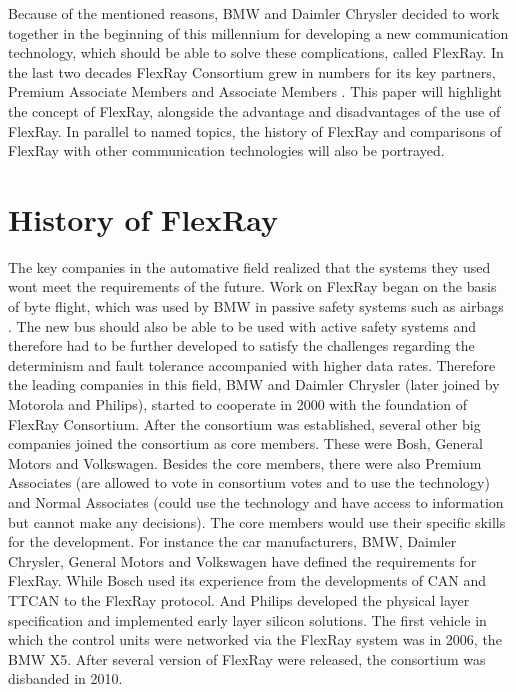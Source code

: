 \documentclass[conference]{IEEEtran}
\begin{document}
Because of the mentioned reasons, BMW and Daimler Chrysler decided to work together in the beginning of this millennium for developing a new communication technology, which should be able to solve these complications, called FlexRay. In the last two decades FlexRay Consortium grew in numbers for its key partners, Premium Associate Members and Associate Members \cite{enosh2014efficient}. This paper will highlight the concept of FlexRay, alongside the advantage and disadvantages of the use of FlexRay. In parallel to named topics, the history of FlexRay and comparisons of FlexRay with other communication technologies will also be portrayed.


\section{History of FlexRay}
The key companies in the automative field realized that the systems they used wont meet the requirements of the future. Work on FlexRay began on the basis of byte flight, which was used by BMW in passive safety systems such as airbags \cite{kopetz2001comparison}. The new bus should also be able to be used with active safety systems and therefore had to be further developed to satisfy the challenges regarding the determinism and fault tolerance accompanied with higher data rates. Therefore the leading companies in this field, BMW and Daimler Chrysler (later joined by Motorola and Philips), started to cooperate in 2000 with the foundation of FlexRay Consortium. After the consortium was established, several other big companies joined the consortium as core members. These were Bosh, General Motors and Volkswagen. Besides the core members, there were also Premium Associates (are allowed to vote in consortium votes and to use the technology) and Normal Associates (could use the technology and have access to information but cannot make any decisions). The core members would use their specific skills for the development. For instance the car manufacturers, BMW, Daimler Chrysler, General Motors and Volkswagen have defined the requirements for FlexRay. While Bosch used its experience from the developments of CAN and TTCAN to the FlexRay protocol. And Philips developed the physical layer specification and implemented early layer silicon solutions. The first vehicle in which the control units were networked via the FlexRay system was in 2006, the BMW X5. After several version of FlexRay were released, the consortium was disbanded in 2010.
\end{document}
